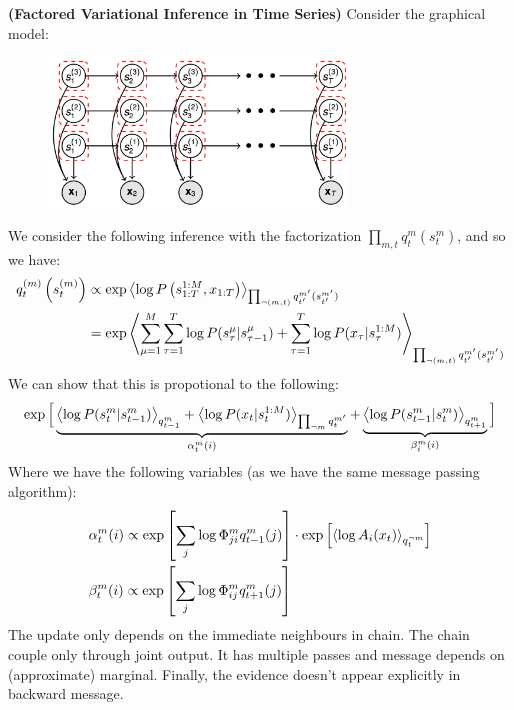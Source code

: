 \begin{remark}{\textbf{(Factored Variational Inference in Time Series)}}
    Consider the graphical model:
    \begin{figure}[H]
        \centering
        \includegraphics[width=8cm]{img/img12.png}
    \end{figure}  
    We consider the following inference with the factorization $\prod_{m,t}q^m_t(s^m_t)$, and so we have:
    \begin{equation*}
    \begin{aligned}
        q^{(m)}_t\left( s^{(m)}_t \right) &\propto \exp\left\langle  \log P\left( s^{1:M}_{1:T}, x_{1:T} \right)  \right\rangle_{\prod_{\neg(m, t)} q^{m'}_{t'}(s^{m'}_{t'}) } \\
        &=\exp\left\langle \sum_{\mu=1}^M\sum_{\tau=1}^T \log P(s^\mu_\tau | s^\mu_{\tau-1}) + \sum^T_{\tau=1}\log P(x_\tau | s^{1:M}_\tau)  \right\rangle_{\prod_{\neg(m, t)} q^{m'}_{t'}(s^{m'}_{t'}) } \\
    \end{aligned}
    \end{equation*}
    We can show that this is propotional to the following:
    \begin{equation*}
        \exp\Big[ \underbrace{\left\langle \log P(s^m_t | s^m_{t-1}) \right\rangle_{q^m_{t-1}} + \left\langle \log P(x_t | s^{1:M}_t) \right\rangle_{\prod_{\neg m}q^{m'}_t}}_{\alpha^m_t(i)} + \underbrace{\left\langle \log P(s^m_{t-1} | s^m_t) \right\rangle_{q^m_{t+1}}}_{\beta^m_i(i)} \Big]
    \end{equation*}
    Where we have the following variables (as we have the same message passing algorithm):
    \begin{equation*}
    \begin{aligned}
        &\alpha^m_t(i)\propto \exp\left[ \sum_j \log \Phi^m_{ji}q^m_{t-1}(j) \right]\cdot\exp\left[ \left\langle \log A_i(x_t) \right\rangle_{q^{\neg m}_t}  \right] \\
        &\beta^m_t(i)\propto \exp\left[ \sum_j \log \Phi^m_{ij}q^m_{t+1}(j) \right]
    \end{aligned}
    \end{equation*}
    The update only depends on the immediate neighbours in chain. The chain couple only through joint output. It has multiple passes and message depends on (approximate) marginal. Finally, the evidence doesn't appear explicitly in backward message. 
\end{remark}

